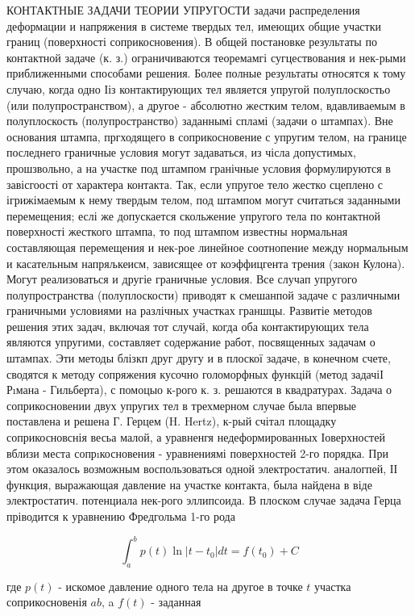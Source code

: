 \documentclass[10pt]{article}
\begin{document}
КОНТАКТНЫЕ ЗАДАЧИ ТЕОРИИ УПРУГОСТИ задачи распределения деформации и напряжения в системе твердых тел, имеющих общие участки границ (поверхності соприкосновения). В общей постановке результаты по контактной задаче (к. з.) ограничиваются теоремамгі сугцествования и нек-рыми приближенными способами решения. Более полные результаты относятся к тому случаю, когда одно Ііз контактирующих тел является упругой полуплоскостьо (или полупространством), а другое - абсолютно жестким телом, вдавливаемым в полуплоскость (полупространство) заданнымі спламі (задачи о штампах). Вне основания штампа, пргходящего в соприкосновение с упругим телом, на границе последнего граничные условия могут задаваться, из чісла допустимых, прошзвольно, а на участке под штампом гранічные условия формулируются в завісгоості от характера контакта. Так, если упругое тело жестко сцеплено с ігрижімаемым к нему твердым телом, под штампом могут считаться заданными перемещения; еслі же допускается скольжение упругого тела по контактной поверхності жесткого штампа, то под штампом известны нормальная составляющая перемещения и нек-рое линейное соотнопение между нормальным и касательным напряљкеисм, зависящее от коэффицгента трения (закон Кулона). Могут реализоваться и другіе граничные условия. Все случап упругого полупространства (полуплоскости) приводят к смешанпой задаче с различными граничными условиями на разлічных участках граншцы. Развитіе методов решения этих задач, включая тот случай, когда оба контактирующих тела являются упругими, составляет содержание работ, посвященных задачам о штампах. Эти методы блізкп друг другу и в плоскої задаче, в конечном счете, сводятся к методу сопряжения кусочно голоморфных функцій (метод задачіІ Рıмана - Гильберта), с помоцыо к-рого к. з. решаются в квадратурах. Задача о соприкосновении двух упругих тел в трехмерном случае была впервые поставлена и решена Г. Герцем (H. Hertz), к-рый счітал площадку соприкосновснія весьа малой, а уравненгя недеформированных Іоверхностей вблизи места сопрıкосновения - уравнениямі поверхностей 2-го порядка. При этом оказалось возможным воспользоваться одной электростатич. аналогпей, ІІ функция, выражающая давление на участке контакта, была найдена в віде электростатич. потенциала нек-рого эллипсоида. В плоском случае задача Герца пріводится к уравнению Фредгольма 1-го рода



\[

\int_{a}^{b} p(t) \ln \left|t-t_{0}\right| d t=f\left(t_{0}\right)+C

\]



где $p(t)$ - искомое давление одного тела на другое в точке $t$ участка соприкосновенія $a b$, a $f(t)$ - заданная
\end{document}
